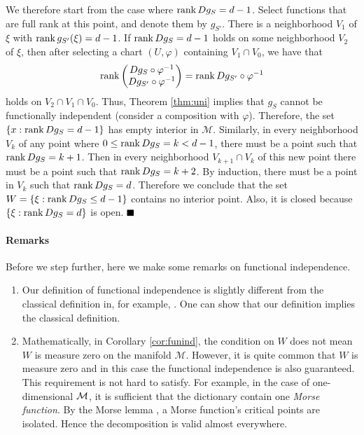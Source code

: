 We therefore start from the case where $\operatorname{rank} Dg_S = d-1$. Select functions that are full rank at this point, and denote them by $g_{S'}$. There is a neighborhood $V_1$ of $\xi$ with $\operatorname{rank} g_{S'}(\xi)=d-1$. If $\operatorname{rank} Dg_S  = d-1$ holds on some neighborhood $V_2$ of $\xi$, then after selecting a chart $(U,\varphi)$ containing $V_1\cap V_0$,  we have that
\begin{equation}
	\operatorname{rank}\begin{pmatrix} D{g_S\circ \varphi^{-1}} \\ D{g_{S'}\circ \varphi^{-1}} \end{pmatrix} = \operatorname{rank} D{g_{S'}\circ\varphi^{-1}}
\end{equation}
holds on $V_2\cap V_1\cap V_0$. Thus, Theorem \ref{thm:uni} implies that $g_S$ cannot be functionally independent (consider a composition with $\varphi$). Therefore, the set $\{x: \operatorname{rank} Dg_S = d-1\}$ has empty interior in $\mathcal{M}$.
Similarly, in every neighborhood $V_{k}$ of any point where $0\leq \operatorname{rank} Dg_S=k < d-1$, there must be a point such that $\operatorname{rank} Dg_S = k+1$. Then in every neighborhood $V_{k+1}\cap V_{k}$ of this new point there must be a point such that $\operatorname{rank} Dg_S = k+2$.  By induction, there must be a point in $V_k$ such that $\operatorname{rank} Dg_S=d$. Therefore we conclude that the set $W=\{\xi:\operatorname{rank} Dg_S \leq d-1\}$ contains no interior point. Also, it is closed because $\{\xi: \operatorname{rank} Dg_S = d\}$ is open.
\hfill $\BlackBox$

\paragraph{Remarks} Before we step further, here we make some remarks on functional independence.
\begin{enumerate}
\item Our definition of functional independence is slightly different from the classical definition in, for example, \cite{Zorich}. One can show that our definition implies the classical definition.
\item Mathematically, in Corollary \ref{cor:funind}, the condition on $W$ does not mean $W$ is measure zero on the manifold $\mathcal{M}$. However, it is quite common that $W$ is measure zero and in this case the functional independence is also guaranteed. This requirement is not hard to satisfy. For example, in the case of one-dimensional ${\cal M}$, it is sufficient that the dictionary contain one {\em Morse function}. By the Morse lemma \cite{morse}, a Morse function's critical points are isolated.  Hence the decomposition is valid almost everywhere. 
\end{enumerate}

